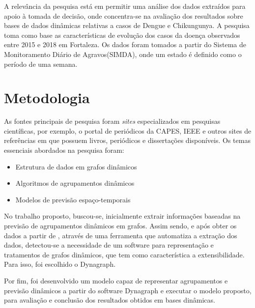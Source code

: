 A relevância da pesquisa está em permitir uma análise dos dados extraídos 
para apoio à tomada de decisão, onde concentra-se na avaliação dos resultados sobre bases de dados
dinâmicas relativas a casos de Dengue e Chikungunya.
A pesquisa toma como base as características de evolução dos casos da doença
observados entre 2015 e 2018 em Fortaleza.
Os dados foram tomados a partir do Sistema de Monitoramento Diário de Agravos(SIMDA), onde um estado é definido como o período de uma semana. 

\section{Metodologia}

As fontes principais de pesquisa foram \textit{sites} especializados em pesquisas científicas, por exemplo, o portal de periódicos
da CAPES, IEEE e outros sites de referências em que possuem livros, periódicos e dissertações disponíveis.
Os temas essenciais abordados na pesquisa foram:
\begin{itemize}
	\item Estrutura de dados em grafos dinâmicos
	\item Algoritmos de agrupamentos dinâmicos
	\item Modelos de previsão espaço-temporais
\end{itemize}

No trabalho proposto, buscou-se, inicialmente extrair informações baseadas na previsão de agrupamentos dinâmicos
em grafos. Assim sendo, e após obter os dados a partir de \cite{simda}, através de uma ferramenta que automatiza a extração dos dados, detectou-se a necessidade de um software para representação e tratamentos de grafos dinâmicos, que tem como característica a extensibilidade. Para isso, foi escolhido o Dynagraph.

\iffalse
...Os métodos estatísticos multivariados podem ser utilizados com propósitos descritivos, exploratórios ou analíticos. 

Para a obtenção das informações espaço-temporais mapeáveis e características do indivíduo, segue-se três estratégias para resolução do problema: na primeira os dados são analisados como um só grupo (Agrupamento Estático); na segunda os dados são tratados por intervalos pré-definidos; na terceira mapeia-se as evoluções entre intervalos observados.
Dessa forma, tal pesquisa visa indicar os possíveis grupos relacionado espacialmente e também no tempo.
\fi

Por fim, foi desenvolvido um modelo capaz de representar agrupamentos e previsão dinâmicos a partir do software Dynagraph e executar o modelo proposto, para avaliação e conclusão dos resultados obtidos em bases dinâmicas.

